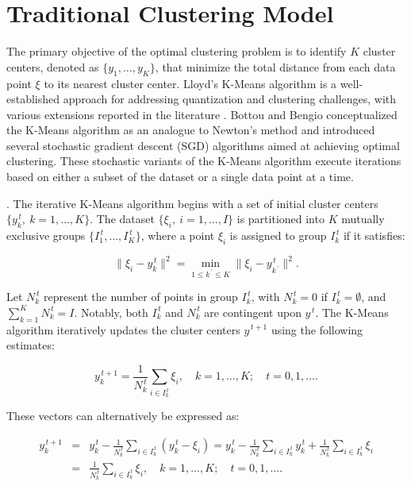 \section{Traditional Clustering Model}

The primary objective of the optimal clustering problem is to identify $K$ cluster centers, denoted as $\{ y_1, \ldots, y_K \}$, that minimize the total distance from each data point $\xi$ to its nearest cluster center. Lloyd's K-Means algorithm \cite{Lloyd_1982} is a well-established approach for addressing quantization and clustering challenges, with various extensions reported in the literature \cite{Jain_2010}. Bottou and Bengio \cite{Bottou_1994} conceptualized the K-Means algorithm as an analogue to Newton's method and introduced several stochastic gradient descent (SGD) algorithms aimed at achieving optimal clustering. These stochastic variants of the K-Means algorithm execute iterations based on either a subset of the dataset or a single data point at a time.

\begin{definition}
    \label{K-Means} 
    \cite{Lloyd_1982}. The iterative K-Means algorithm begins with a set of initial cluster centers $\{ y_k^{\,t}, \> k = 1, \ldots, K \}$. The dataset $\{ \xi_i, \> i = 1, \ldots, I \}$ is partitioned into $K$ mutually exclusive groups $\{ I_1^{\,t}, \ldots, I_K^{\,t} \}$, where a point $\xi_i$ is assigned to group $I_k^{\,t}$ if it satisfies:

    \begin{equation}
        \label{kmeans-group:eq}
        \| \xi_i - y_k^{\,t} \|^2 = \min_{1 \leq k^{\,\prime} \leq K} \| \xi_i - y_{k^{\,\prime}}^{\,t} \|^2.
    \end{equation}

    \noindent Let $N_k^{\,t}$ represent the number of points in group $I_k^{\,t}$, with $N_k^{\,t} = 0$ if $I_k^{\,t} = \emptyset$, and $\sum_{k=1}^K N_k^{\,t} = I$. Notably, both $I_k^{\,t}$ and $N_k^{\,t}$ are contingent upon $y^{\,t}$. The K-Means algorithm iteratively updates the cluster centers $y^{\,t+1}$ using the following estimates:

    \begin{equation}
        \label{kmeans-center-estimation:eq}
        y_{k}^{\,t + 1} = \frac{1}{N_k^{\,t}} \sum_{i \in I_k^{\,t}} \xi_i, \quad k = 1, \ldots, K; \quad t = 0, 1, \ldots.
    \end{equation}

    \noindent These vectors can alternatively be expressed as:

    \begin{eqnarray}
        \label{kmeans-center-alt:eq}
        y_{k}^{\,t + 1} &=& y_k^{\,t} - \frac{1}{N_k^{\,t}} \sum_{i \in I_k^{\,t}} (y_k^{\,t} - \xi_i) = y_k^{\,t} - \frac{1}{N_k^{\,t}} \sum_{i \in I_k^{\,t}} y_k^{\,t} + \frac{1}{N_k^{\,t}} \sum_{i \in I_k^{\,t}} \xi_i \nonumber \\
        &=& \frac{1}{N_k^{\,t}} \sum_{i \in I_k^{\,t}} \xi_i, \quad k = 1, \ldots, K; \quad t = 0, 1, \ldots.
    \end{eqnarray}
\end{definition}

